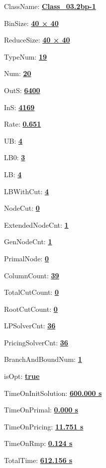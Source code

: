\documentclass[11pt]{article}
\begin{document}
\pagestyle{empty}


ClassName: \underline{\textbf{Class_03.2bp-1}}
\par
BinSize: \underline{\textbf{40 × 40}}
\par
ReduceSize: \underline{\textbf{40 × 40}}
\par
TypeNum: \underline{\textbf{19}}
\par
Num: \underline{\textbf{20}}
\par
OutS: \underline{\textbf{6400}}
\par
InS: \underline{\textbf{4169}}
\par
Rate: \underline{\textbf{0.651}}
\par
UB: \underline{\textbf{4}}
\par
LB0: \underline{\textbf{3}}
\par
LB: \underline{\textbf{4}}
\par
LBWithCut: \underline{\textbf{4}}
\par
NodeCut: \underline{\textbf{0}}
\par
ExtendedNodeCnt: \underline{\textbf{1}}
\par
GenNodeCnt: \underline{\textbf{1}}
\par
PrimalNode: \underline{\textbf{0}}
\par
ColumnCount: \underline{\textbf{39}}
\par
TotalCutCount: \underline{\textbf{0}}
\par
RootCutCount: \underline{\textbf{0}}
\par
LPSolverCnt: \underline{\textbf{36}}
\par
PricingSolverCnt: \underline{\textbf{36}}
\par
BranchAndBoundNum: \underline{\textbf{1}}
\par
isOpt: \underline{\textbf{true}}
\par
TimeOnInitSolution: \underline{\textbf{600.000 s}}
\par
TimeOnPrimal: \underline{\textbf{0.000 s}}
\par
TimeOnPricing: \underline{\textbf{11.751 s}}
\par
TimeOnRmp: \underline{\textbf{0.124 s}}
\par
TotalTime: \underline{\textbf{612.156 s}}
\par
\newpage


\end{document}
